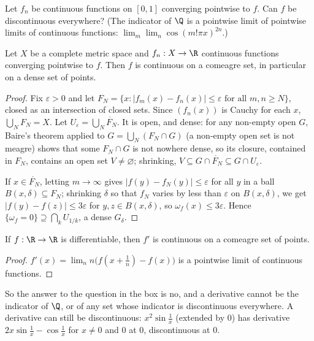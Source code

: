 \begin{think}
Let $f_n$ be continuous functions on $[0,1]$ converging pointwise to $f$. Can $f$ be discontinuous everywhere? (The indicator of $\Q$ is a pointwise limit
of pointwise limits of continuous functions: $\lim_m\lim_n\cos(m!\pi x)^{2n}$.)
\end{think}

\begin{theorem}[Baire, 1899]\label{thm:baireclassone}
Let $X$ be a complete metric space and $f_n:X\to\R$ continuous functions converging pointwise to $f$. Then $f$ is continuous on a comeagre set, in particular on a
dense set of points.
\end{theorem}
\begin{proof}
Fix $\varepsilon>0$ and let $F_N=\{x:|f_m(x)-f_n(x)|\le\varepsilon\text{ for all }m,n\ge N\}$, closed as an intersection of closed sets. Since $(f_n(x))$ is Cauchy for each $x$, $\bigcup_NF_N=X$.
Let $U_\varepsilon=\bigcup_N\mathring{F_N}$. It is open, and dense: for any non-empty open $G$, Baire's theorem applied to $G=\bigcup_N(F_N\cap G)$ (a non-empty open set is not
meagre) shows that some $F_N\cap G$ is not nowhere dense, so its closure, contained in $F_N$, contains an open set $V\ne\varnothing$; shrinking, $V\subseteq G\cap\mathring{F_N}\subseteq G\cap U_\varepsilon$.

If $x\in\mathring{F_N}$, letting $m\to\infty$ gives $|f(y)-f_N(y)|\le\varepsilon$ for all $y$ in a ball $B(x,\delta)\subseteq F_N$; shrinking $\delta$ so that $f_N$ varies by less than $\varepsilon$ on $B(x,\delta)$, we get
$|f(y)-f(z)|\le3\varepsilon$ for $y,z\in B(x,\delta)$, so $\omega_f(x)\le3\varepsilon$. Hence $\{\omega_f=0\}\supseteq\bigcap_kU_{1/k}$, a dense $G_\delta$.
\end{proof}

\begin{corollary}\label{cor:derivative}
If $f:\R\to\R$ is differentiable, then $f'$ is continuous on a comeagre set of points.
\end{corollary}
\begin{proof}
$f'(x)=\lim_n n\bigl(f(x+\frac1n)-f(x)\bigr)$ is a pointwise limit of continuous functions.
\end{proof}

So the answer to the question in the box is no, and a derivative cannot be the indicator of $\Q$, or of any set whose indicator is
discontinuous everywhere. A derivative can still be discontinuous: $x^2\sin\frac1x$ (extended by $0$) has derivative $2x\sin\frac1x-\cos\frac1x$ for $x\ne0$ and
$0$ at $0$, discontinuous at $0$.

